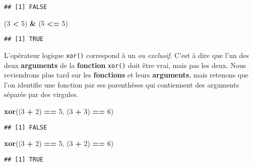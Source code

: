\documentclass[]{book}
\newenvironment{Shaded}{\begin{snugshade}}{\end{snugshade}}
\newcommand{\KeywordTok}[1]{\textcolor[rgb]{0.13,0.29,0.53}{\textbf{#1}}}
\newcommand{\DecValTok}[1]{\textcolor[rgb]{0.00,0.00,0.81}{#1}}
\newcommand{\StringTok}[1]{\textcolor[rgb]{0.31,0.60,0.02}{#1}}
\newcommand{\OperatorTok}[1]{\textcolor[rgb]{0.81,0.36,0.00}{\textbf{#1}}}
\newcommand{\NormalTok}[1]{#1}
\theoremstyle{definition}
\theoremstyle{definition}
\theoremstyle{definition}
\theoremstyle{remark}
\begin{document}
\begin{verbatim}
## [1] FALSE
\end{verbatim}

\begin{Shaded}
\begin{Highlighting}[]
\NormalTok{(}\DecValTok{3} \OperatorTok{<}\StringTok{ }\DecValTok{5}\NormalTok{) }\OperatorTok{&}\StringTok{ }\NormalTok{(}\DecValTok{5} \OperatorTok{<=}\StringTok{ }\DecValTok{5}\NormalTok{)}
\end{Highlighting}
\end{Shaded}

\begin{verbatim}
## [1] TRUE
\end{verbatim}

L'opérateur logique \texttt{xor()} correspond à un \emph{ou exclusif}.
C'est à dire que l'un des deux \textbf{arguments} de la
\textbf{fonction} \texttt{xor()} doit être vrai, mais pas les deux. Nous
reviendrons plus tard sur les \textbf{fonctions} et leurs
\textbf{arguments}, mais retenons que l'on identifie une fonction par
ses parenthèses qui contiennent des arguments séparés par des virgules.

\begin{Shaded}
\begin{Highlighting}[]
\KeywordTok{xor}\NormalTok{((}\DecValTok{3} \OperatorTok{+}\StringTok{ }\DecValTok{2}\NormalTok{) }\OperatorTok{==}\StringTok{ }\DecValTok{5}\NormalTok{, (}\DecValTok{3} \OperatorTok{+}\StringTok{ }\DecValTok{3}\NormalTok{) }\OperatorTok{==}\StringTok{ }\DecValTok{6}\NormalTok{)}
\end{Highlighting}
\end{Shaded}

\begin{verbatim}
## [1] FALSE
\end{verbatim}

\begin{Shaded}
\begin{Highlighting}[]
\KeywordTok{xor}\NormalTok{((}\DecValTok{3} \OperatorTok{+}\StringTok{ }\DecValTok{2}\NormalTok{) }\OperatorTok{==}\StringTok{ }\DecValTok{5}\NormalTok{, (}\DecValTok{3} \OperatorTok{+}\StringTok{ }\DecValTok{2}\NormalTok{) }\OperatorTok{==}\StringTok{ }\DecValTok{6}\NormalTok{)}
\end{Highlighting}
\end{Shaded}

\begin{verbatim}
## [1] TRUE
\end{verbatim}
\end{document}
